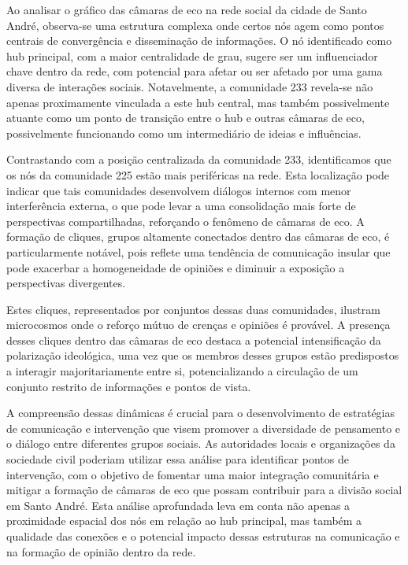 Ao analisar o gráfico das câmaras de eco na rede social da cidade de Santo André, observa-se uma estrutura complexa onde certos nós agem como pontos centrais de convergência e disseminação de informações. O nó identificado como hub principal, com a maior centralidade de grau, sugere ser um influenciador chave dentro da rede, com potencial para afetar ou ser afetado por uma gama diversa de interações sociais. Notavelmente, a comunidade 233 revela-se não apenas proximamente vinculada a este hub central, mas também possivelmente atuante como um ponto de transição entre o hub e outras câmaras de eco, possivelmente funcionando como um intermediário de ideias e influências.

Contrastando com a posição centralizada da comunidade 233, identificamos que os nós da comunidade 225 estão mais periféricas na rede. Esta localização pode indicar que tais comunidades desenvolvem diálogos internos com menor interferência externa, o que pode levar a uma consolidação mais forte de perspectivas compartilhadas, reforçando o fenômeno de câmaras de eco. A formação de cliques, grupos altamente conectados dentro das câmaras de eco, é particularmente notável, pois reflete uma tendência de comunicação insular que pode exacerbar a homogeneidade de opiniões e diminuir a exposição a perspectivas divergentes.

Estes cliques, representados por conjuntos dessas duas comunidades, ilustram microcosmos onde o reforço mútuo de crenças e opiniões é provável. A presença desses cliques dentro das câmaras de eco destaca a potencial intensificação da polarização ideológica, uma vez que os membros desses grupos estão predispostos a interagir majoritariamente entre si, potencializando a circulação de um conjunto restrito de informações e pontos de vista.

A compreensão dessas dinâmicas é crucial para o desenvolvimento de estratégias de comunicação e intervenção que visem promover a diversidade de pensamento e o diálogo entre diferentes grupos sociais. As autoridades locais e organizações da sociedade civil poderiam utilizar essa análise para identificar pontos de intervenção, com o objetivo de fomentar uma maior integração comunitária e mitigar a formação de câmaras de eco que possam contribuir para a divisão social em Santo André. Esta análise aprofundada leva em conta não apenas a proximidade espacial dos nós em relação ao hub principal, mas também a qualidade das conexões e o potencial impacto dessas estruturas na comunicação e na formação de opinião dentro da rede.

